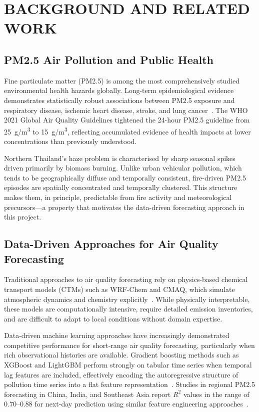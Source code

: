 \documentclass[12pt,a4paper]{report}
\begin{document}
\chapter{BACKGROUND AND RELATED WORK}

\section{PM2.5 Air Pollution and Public Health}

Fine particulate matter (PM2.5) is among the most comprehensively studied environmental health hazards globally. Long-term epidemiological evidence demonstrates statistically robust associations between PM2.5 exposure and respiratory disease, ischemic heart disease, stroke, and lung cancer~\cite{who2021}. The WHO 2021 Global Air Quality Guidelines tightened the 24-hour PM2.5 guideline from 25~\textmu g/m\textsuperscript{3} to 15~\textmu g/m\textsuperscript{3}, reflecting accumulated evidence of health impacts at lower concentrations than previously understood.

Northern Thailand's haze problem is characterised by sharp seasonal spikes driven primarily by biomass burning. Unlike urban vehicular pollution, which tends to be geographically diffuse and temporally consistent, fire-driven PM2.5 episodes are spatially concentrated and temporally clustered. This structure makes them, in principle, predictable from fire activity and meteorological precursors---a property that motivates the data-driven forecasting approach in this project.

\section{Data-Driven Approaches for Air Quality Forecasting}

Traditional approaches to air quality forecasting rely on physics-based chemical transport models (CTMs) such as WRF-Chem and CMAQ, which simulate atmospheric dynamics and chemistry explicitly~\cite{seinfeld2016}. While physically interpretable, these models are computationally intensive, require detailed emission inventories, and are difficult to adapt to local conditions without domain expertise.

Data-driven machine learning approaches have increasingly demonstrated competitive performance for short-range air quality forecasting, particularly when rich observational histories are available. Gradient boosting methods such as XGBoost and LightGBM perform strongly on tabular time series when temporal lag features are included, effectively encoding the autoregressive structure of pollution time series into a flat feature representation~\cite{chen2016xgboost}. Studies in regional PM2.5 forecasting in China, India, and Southeast Asia report $R^2$ values in the range of 0.70--0.88 for next-day prediction using similar feature engineering approaches~\cite{liang2020}.
\end{document}
